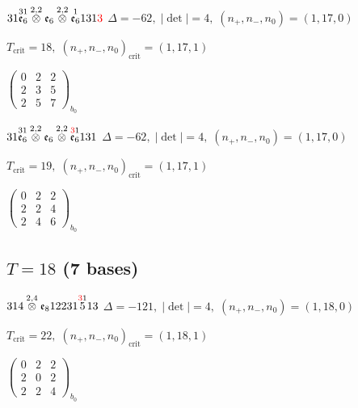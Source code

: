 \documentclass[10pt]{article}
\begin{document}
$31\overset{31}{\mathfrak{e}_6}\overset{2,2}{\otimes}\mathfrak{e}_6\overset{2,2}{\otimes}\overset{1}{\mathfrak{e}_6}131\textcolor{red}{3}$ \quad $\Delta=-62,\; |\det|=4,\; (n_+,n_-,n_0)=(1,17,0)$

\hspace{1em}$T_{\text{crit}}=18,\; (n_+,n_-,n_0)_{\text{crit}}=(1,17,1)$

\hspace{2em}$\left(\begin{smallmatrix}0 & 2 & 2 \\ 2 & 3 & 5 \\ 2 & 5 & 7\end{smallmatrix}\right)_{\!b_0}$

$31\overset{31}{\mathfrak{e}_6}\overset{2,2}{\otimes}\mathfrak{e}_6\overset{2,2}{\otimes}\overset{\textcolor{red}{3}1}{\mathfrak{e}_6}131$ \quad $\Delta=-62,\; |\det|=4,\; (n_+,n_-,n_0)=(1,17,0)$

\hspace{1em}$T_{\text{crit}}=19,\; (n_+,n_-,n_0)_{\text{crit}}=(1,17,1)$

\hspace{2em}$\left(\begin{smallmatrix}0 & 2 & 2 \\ 2 & 2 & 4 \\ 2 & 4 & 6\end{smallmatrix}\right)_{\!b_0}$


\subsection*{$T = 18$ \quad (7 bases)}
\smallskip

$314\overset{2,4}{\otimes}\mathfrak{e}_812231\overset{\textcolor{red}{3}1}{5}13$ \quad $\Delta=-121,\; |\det|=4,\; (n_+,n_-,n_0)=(1,18,0)$

\hspace{1em}$T_{\text{crit}}=22,\; (n_+,n_-,n_0)_{\text{crit}}=(1,18,1)$

\hspace{2em}$\left(\begin{smallmatrix}0 & 2 & 2 \\ 2 & 0 & 2 \\ 2 & 2 & 4\end{smallmatrix}\right)_{\!b_0}$

\smallskip
\end{document}
